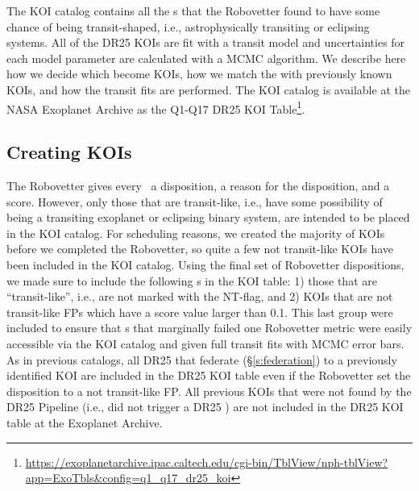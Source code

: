 The KOI catalog contains all the \opstce s that the Robovetter found to have some chance of being transit-shaped, i.e., astrophysically transiting or eclipsing systems. All of the DR25 KOIs are fit with a transit model and uncertainties for each model parameter are calculated with a MCMC algorithm.  We describe here how we decide which  become KOIs, how we match the  with previously known KOIs, and how the transit fits are performed. The KOI catalog is available at the NASA Exoplanet Archive as the Q1-Q17 DR25 KOI Table\footnote{\url{https://exoplanetarchive.ipac.caltech.edu/cgi-bin/TblView/nph-tblView?app=ExoTbls\&config=q1\_q17\_dr25\_koi}}.
\label{koisec}

\subsection{Creating KOIs}
The Robovetter gives every \opstce\ a disposition, a reason for the disposition, and a score.  However, only those that are transit-like, i.e., have some possibility of being a transiting exoplanet or eclipsing binary system, are intended to be placed in the KOI catalog. For scheduling reasons, we created the majority of KOIs before we completed the Robovetter, so quite a few not transit-like KOIs have been included in the KOI catalog. Using the final set of Robovetter dispositions, we made sure to include the following \opstce s in the KOI table: 1) those that are ``transit-like'', i.e., are not marked with the NT-flag, and 2) KOIs that are not transit-like FPs which have a score value larger than 0.1.  This last group were included to ensure that \opstce s that marginally failed one Robovetter metric were easily accessible via the KOI catalog and given full transit fits with MCMC error bars. As in previous catalogs, all DR25  that federate (\S\ref{s:federation}) to a previously identified KOI are included in the DR25 KOI table even if the Robovetter set the disposition to a not transit-like FP. All previous KOIs that were not found by the DR25 \Kepler{} Pipeline (i.e., did not trigger a DR25 \opstce{}) are not included in the DR25 KOI table at the Exoplanet Archive.


